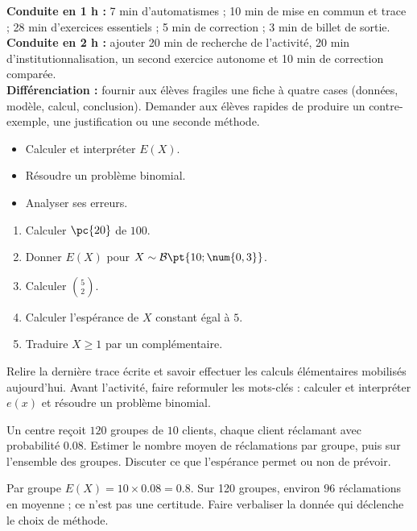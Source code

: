 \ifmxteacher
\begin{method}
\textbf{Conduite en 1 h :} 7 min d'automatismes ; 10 min de mise en commun et trace ; 28 min d'exercices essentiels ; 5 min de correction ; 3 min de billet de sortie.\\
\textbf{Conduite en 2 h :} ajouter 20 min de recherche de l'activité, 20 min d'institutionnalisation, un second exercice autonome et 10 min de correction comparée.\\
\textbf{Différenciation :} fournir aux élèves fragiles une fiche à quatre cases (données, modèle, calcul, conclusion). Demander aux élèves rapides de produire un contre-exemple, une justification ou une seconde méthode.
\end{method}
\fi
{}
\begin{objectives}\begin{itemize}\item Calculer et interpréter $E(X)$.\item Résoudre un problème binomial.\item Analyser ses erreurs.\end{itemize}\end{objectives}
\begin{fluency}\begin{enumerate}\item Calculer $\pc{20}$ de $100$. \item Donner $E(X)$ pour $X\sim\mathcal B\pt{10;\num{0,3}}$. \item Calculer $\binom52$. \item Calculer l'espérance de $X$ constant égal à $5$. \item Traduire $X\geq1$ par un complémentaire. \end{enumerate}\end{fluency}
\begin{prerequisites}Relire la dernière trace écrite et savoir effectuer les calculs élémentaires mobilisés aujourd'hui. Avant l'activité, faire reformuler les mots-clés : calculer et interpréter $e(x)$ et résoudre un problème binomial.\end{prerequisites}

\begin{activity}
Un centre reçoit $120$ groupes de $10$ clients, chaque client réclamant avec probabilité $\num{0,08}$. Estimer le nombre moyen de réclamations par groupe, puis sur l'ensemble des groupes. Discuter ce que l'espérance permet ou non de prévoir.

\end{activity}
\begin{solution}Par groupe $E(X)=10\times\num{0,08}=\num{0,8}$. Sur 120 groupes, environ $96$ réclamations en moyenne ; ce n'est pas une certitude. Faire verbaliser la donnée qui déclenche le choix de méthode.\end{solution}

